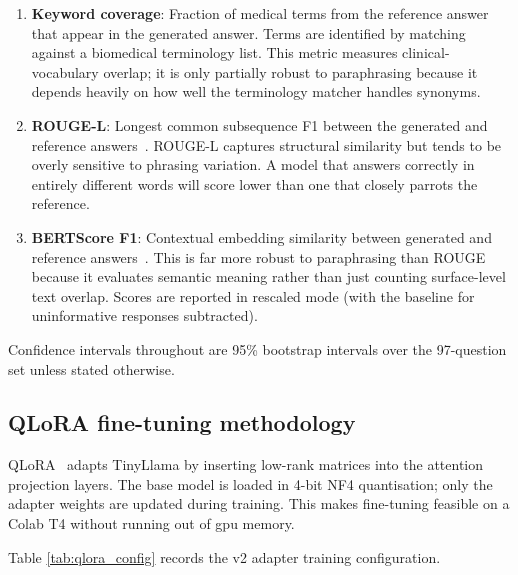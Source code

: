 \begin{enumerate}
    \item \textbf{Keyword coverage}: Fraction of medical terms from the reference answer that appear in the generated answer. Terms are identified by matching against a biomedical terminology list. This metric measures clinical-vocabulary overlap; it is only partially robust to paraphrasing because it depends heavily on how well the terminology matcher handles synonyms.
    \item \textbf{ROUGE-L}: Longest common subsequence F1 between the generated and reference answers~\cite{lin2004rouge}. ROUGE-L captures structural similarity but tends to be overly sensitive to phrasing variation. A model that answers correctly in entirely different words will score lower than one that closely parrots the reference.
    \item \textbf{BERTScore F1}: Contextual embedding similarity between generated and reference answers~\cite{zhang2019bertscore}. This is far more robust to paraphrasing than ROUGE because it evaluates semantic meaning rather than just counting surface-level text overlap. Scores are reported in rescaled mode (with the baseline for uninformative responses subtracted).
\end{enumerate}

Confidence intervals throughout are 95\% bootstrap intervals over the 97-question set unless stated otherwise.

\subsection{QLoRA fine-tuning methodology}

QLoRA~\cite{dettmers2023qlora} adapts TinyLlama by inserting low-rank matrices into the attention projection layers. The base model is loaded in 4-bit NF4 quantisation; only the adapter weights are updated during training. This makes fine-tuning feasible on a Colab T4 without running out of \ac{gpu} memory.

Table \ref{tab:qlora_config} records the v2 adapter training configuration.

